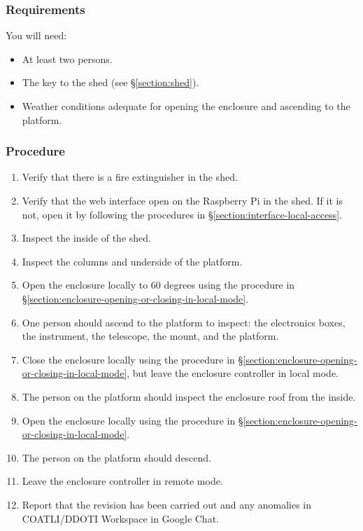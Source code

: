 
\subsubsection{Requirements}

You will need:
\begin{itemize}
\item At least two persons.
\item The key to the shed (see \S\ref{section:shed}).
\item Weather conditions adequate for opening the enclosure and ascending to the platform.
\end{itemize}

\subsubsection{Procedure}

\begin{enumerate}
\item
Verify that there is a fire extinguisher in the shed.
\item 
Verify that the web interface open on the Raspberry Pi in the shed. If it is not, open it by following the procedures in \S\ref{section:interface-local-access}.
\item 
Inspect the inside of the shed. 
\item 
Inspect the columns and underside of the platform.
\item
Open the enclosure locally to 60 degrees using the procedure in \S\ref{section:enclosure-opening-or-closing-in-local-mode}.
\item
One person should ascend to the platform to inspect: the electronics boxes, the instrument, the telescope, the mount, and the platform.
\item
Close the enclosure locally using the procedure in \S\ref{section:enclosure-opening-or-closing-in-local-mode}, but leave the enclosure controller in local mode.
\item
The person on the platform should inspect the enclosure roof from the inside.
\item
Open the enclosure locally using the procedure in \S\ref{section:enclosure-opening-or-closing-in-local-mode}.
\item
The person on the platform should descend.
\item
Leave the enclosure controller in remote mode.
\item
Report that the revision has been carried out and any anomalies in COATLI/DDOTI Workspace in Google Chat.
\end{enumerate}

